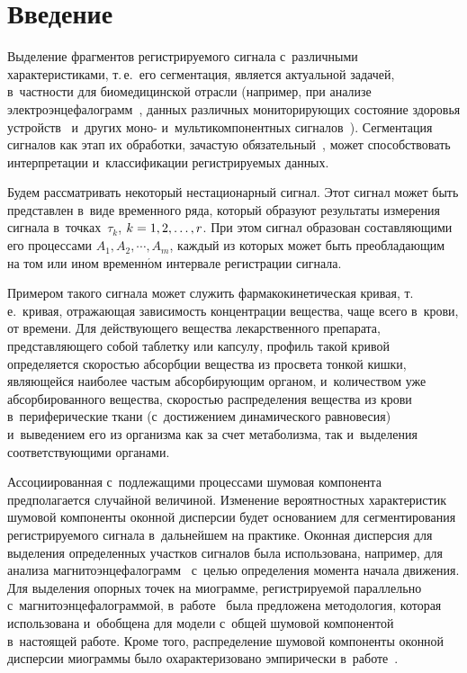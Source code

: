 

\vspace*{2pt}



\thispagestyle{headings}

\begin{multicols}{2}

\label{st\stat}

\section{Введение}


Выделение фрагментов регистрируемого сигнала с~различными характеристиками, т.\,е.\ 
его сегментация, является актуальной задачей, в~частности для биомедицинской отрасли 
(например, при анализе электроэнцефалограмм~\cite{Kos, Aza}, данных различных 
мониторирующих состояние здоровья устройств~\cite{Kal} и~других моно- 
и~мультикомпонентных сигналов~\cite{Z7}). Сегментация сигналов как этап их обработки, 
зачастую обязательный~\cite{Kal, Z7}, может способствовать интерпретации 
и~классификации регистрируемых данных.

Будем рассматривать некоторый нестационарный сигнал. Этот сигнал может быть 
пред\-став\-лен в~виде временного ряда, который образуют результаты измерения 
сигнала в~точках~$\tau_{k}$, $k\hm =  1, 2, \ldots, r$. При этом сигнал образован 
составляющими его процессами $A_{1}, A_{2}, \cdots, A_{m}$, каждый из которых 
может быть преобладающим на том или ином временн$\acute{\mbox{о}}$м интервале регистрации сигнала.

Примером такого сигнала может служить фармакокинетическая кривая, т.\,е.\ 
кривая, отра\-жа\-ющая зависимость концентрации вещества, чаще всего в~крови, от времени. 
Для действующего вещества лекарственного препарата, пред\-став\-ля\-юще\-го собой таблетку 
или капсулу, профиль такой кривой определяется ско\-ростью абсорбции вещества из 
просвета тонкой кишки, являющейся наиболее час\-тым абсорбирующим органом, и~количеством 
уже абсорбированного вещества, ско\-ростью распределения вещества из 
крови в~периферические ткани (с~достижением динамического равновесия) и~выведением 
его из организма как за счет метаболизма, так и~выделения соответствующими органами.

Ассоциированная с~подлежащими процессами шумовая компонента предполагается 
случайной величи\-ной. Изменение вероятностных характеристик шумовой компоненты 
оконной дисперсии будет основанием для сегментирования ре\-гист\-ри\-ру\-емо\-го 
сигнала в~дальнейшем на практике. Оконная дисперсия для выделения определенных 
участков сигналов была использована, например, для анализа 
магнитоэнцефалограмм~\cite{Z7} с~целью определения момента начала движения. 
Для выделения опорных точек на миограмме, регистрируемой параллельно 
с~магнитоэнцефалограммой, в~работе~\cite{Khazi} была предложена методология, 
которая использована и~обобщена для модели с~общей шумовой компонентой в~настоящей 
работе. Кроме того, распределение шумовой компоненты оконной дисперсии миограммы 
было охарактеризовано эмпирически в~работе~\cite{All}.


\end{multicols}
